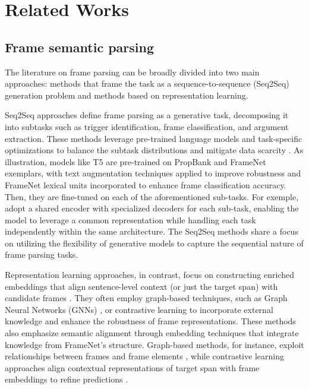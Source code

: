 \section{Related Works}
\subsection{Frame semantic parsing}
The literature on frame parsing can be broadly divided into two main approaches: methods that frame the task as a sequence-to-sequence (Seq2Seq) generation problem and methods based on representation learning. 

Seq2Seq approaches \citep{sutskever2014sequence,raffel2020exploring,kalyanpur2020open,chanin2023open} define frame parsing as a generative task, decomposing it into subtasks such as trigger identification, frame classification, and argument extraction. These methods leverage pre-trained language models and task-specific optimizations to balance the subtask distributions and mitigate data scarcity \citep{kalyanpur2020open,chanin2023open}. As illustration, models like T5 \citep{raffel2020exploring} are pre-trained on PropBank \citep{kingsbury2002treebank, kingsbury2003propbank} and FrameNet exemplars, with text augmentation techniques applied to improve robustness and FrameNet lexical units incorporated to enhance frame classification accuracy. Then, they are fine-tuned on each of the aforementioned sub-tasks. 
For exemple, \citep{kalyanpur2020open} adopt a shared encoder with specialized decoders for each sub-task, enabling the model to leverage a common representation while handling each task independently within the same architecture. The Seq2Seq methods share a focus on utilizing the flexibility of generative models to capture the sequential nature of frame parsing tasks. 

Representation learning approaches, in contrast, focus on constructing enriched embeddings that align sentence-level context (or just the target span) with candidate frames \citep{hartmann2017out, jiang2021exploiting}. They often employ graph-based techniques, such as Graph Neural Networks (GNNs) \citep{wu2020comprehensive}, or contrastive learning \citep{ju2024towards} to incorporate external knowledge and enhance the robustness of frame representations. These methods also emphasize semantic alignment through embedding techniques that integrate knowledge from FrameNet's structure. Graph-based methods, for instance, exploit relationships between frames and frame elements \citep{su2021knowledge, zheng2022double, tamburini2022combining}, while contrastive learning approaches align contextual representations of target span with frame embeddings to refine predictions  \citep{hartmann2017out,jiang2021exploiting,an2023coarse}.

